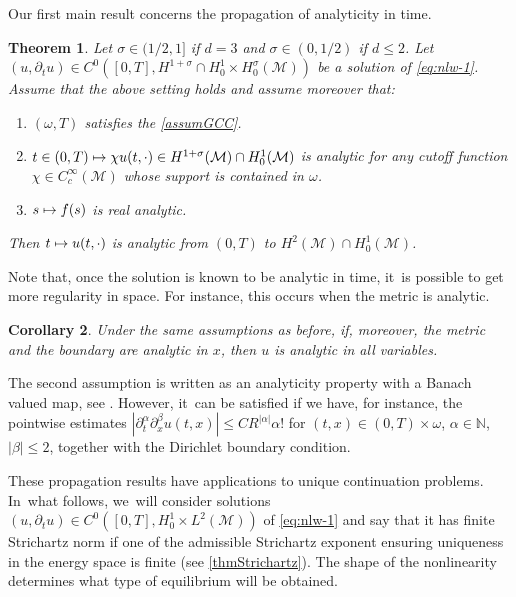 \documentclass[10pt]{amsart}
\newcommand\mto{\mathchoice{\longmapsto}{\mapsto}{\mapsto}{\mapsto}}
\newtheorem{theorem}{Theorem}[section]
\newtheorem{corollary}[theorem]{Corollary}
\theoremstyle{definition}
\let\mc\mathcal
\newcommand{\M}{\mc{M}}
\newcommand{\N}{\mathbb{N}}
\begin{document}
Our first main result concerns the propagation of analyticity in time.


\begin{theorem}\label{thm:analytic-prop}
Let $\sigma\in (1/2, 1]$ if $d=3$ and $\sigma\in (0,1/2)$ if $d\leq 2$. Let $(u,\partial_t u)\in C^0([0, T], H^{1+\sigma}\cap H^1_0\times H^{\sigma}_0(\M))$ be a solution of \eqref{eq:nlw-1}. Assume that the above setting holds and assume moreover that:
\begin{enumerate}
\item $(\omega, T)$ satisfies the \ref{assumGCC}.
\item $t\in (0, T)\mto \chi u(t,\cdot)\in H^{1+\sigma}(\M)\cap H_0^1(\M)$ is analytic for any cutoff function $\chi\in C_c^\infty(\M)$ whose support is contained in $\omega$.
\item $s\mto f( s)$ is real analytic.
\end{enumerate}
Then $t\mto u(t, \cdot)$ is analytic from $(0, T)$ to $H^{2}(\M)\cap H_0^1(\M)$.
\end{theorem}


Note that, once the solution is known to be analytic in time, it~is possible to get more regularity in space. For instance, this occurs when the metric is analytic.

\begin{corollary}
\label{coranalytspacetime}
Under the same assumptions as before, if, moreover, the metric and the boundary are analytic in $x$, then $u$ is analytic in all variables.
\end{corollary}

The second assumption is written as an analyticity property with a Banach valued map, see \cite[Def.\,5.1]{Muj86}. However, it~can be satisfied if we have, for instance, the pointwise estimates $|\partial_t^{\alpha}\partial_x^{\beta}u(t,x)|\leq CR^{|\alpha|}\alpha!$ for $(t,x)\in (0,T)\times \omega$, $\alpha\in \N$, $|\beta|\leq 2$, together with the Dirichlet boundary condition.

These propagation results have applications to unique continuation problems. In~what follows, we~will consider solutions $(u,\partial_t u)\in C^0([0, T], H^1_0\times L^2(\M))$ of \eqref{eq:nlw-1} and say that it has finite Strichartz norm if one of the admissible Strichartz exponent ensuring uniqueness in the energy space is finite (see \cref{thmStrichartz}). The shape of the nonlinearity determines what type of equilibrium will be obtained.
\end{document}
